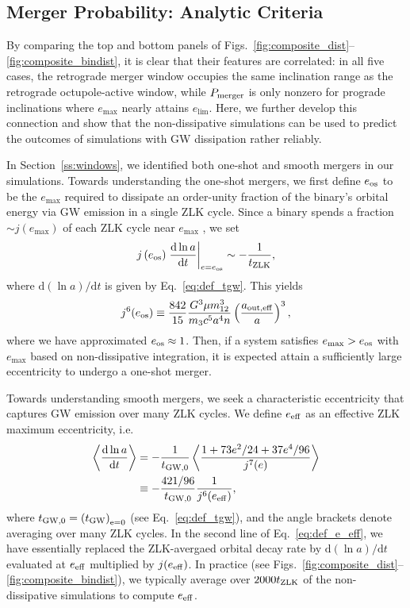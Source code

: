 \documentclass[
        fleqn,
        usenatbib,
    ]{mnras}
\newcommand*{\rd}[2]{\frac{\mathrm{d}#1}{\mathrm{d}#2}}
\newcommand*{\rdil}[2]{\mathrm{d}#1/\mathrm{d}#2}
\newcommand*{\at}[1]{\left.#1\right|}
\newcommand*{\ev}[1]{\left\langle#1\right\rangle}
\newcommand*{\p}[1]{\left(#1\right)}
\begin{document}
\subsection{Merger Probability: Analytic Criteria}\label{ss:nogw_merger}

By comparing the top and bottom panels of
Figs.~\ref{fig:composite_dist}--\ref{fig:composite_bindist}, it is clear that
their features are correlated: in all five cases, the retrograde merger window
occupies the same inclination range as the retrograde octupole-active window,
while $P_{\rm merger}$ is only nonzero for prograde inclinations where
$e_{\max}$ nearly attains $e_{\lim}$. Here, we further develop this connection
and show that the non-dissipative simulations can be used to predict the
outcomes of simulations with GW dissipation rather reliably.

In Section~\ref{ss:windows}, we identified both one-shot and smooth mergers in
our simulations. Towards understanding the one-shot mergers, we first define
$e_{\rm os}$ to be the $e_{\max}$ required to dissipate an order-unity fraction
of the binary's orbital energy via GW emission in a single ZLK cycle. Since a
binary spends a fraction $\sim j(e_{\max})$ of each ZLK cycle near $e_{\max}$
\citep[e.g.,][]{anderson2016formation}, we set
\begin{equation}
    j\p{e_{\rm os}}\at{\rd{\ln a}{t}}_{e = e_{\rm os}} \sim
        -\frac{1}{t_{\rm ZLK}},
\end{equation}
where $\rdil{(\ln a)}{t}$ is given by Eq.~\eqref{eq:def_tgw}. This yields
\begin{equation}
    j^6(e_{\rm os})
        \equiv \frac{842}{15}
            \frac{G^3 \mu m_{12}^3}{m_3c^5a^4n}
            \p{\frac{a_{\rm out, eff}}{a}}^3,
            \label{eq:def_e_os}
\end{equation}
where we have approximated $e_{\rm os} \approx 1$. Then, if a system satisfies
$e_{\max} > e_{\rm os}$ with $e_{\max}$ based on non-dissipative integration, it
is expected attain a sufficiently large eccentricity to undergo a one-shot
merger.

Towards understanding smooth mergers, we seek a characteristic eccentricity that
captures GW emission over many ZLK cycles. We define $e_{\rm eff}$ as an
effective ZLK maximum eccentricity, i.e.
\begin{align}
    \ev{\rd{\ln a}{t}} &= -\frac{1}{t_{\rm GW, 0}}
            \ev{\frac{1 + 73e^2/24 + 37e^4/96}
                {j^7(e)}}\nonumber\\
        &\equiv -\frac{421/96}{t_{\rm GW, 0}}\frac{1}{j^6(e_{\rm eff})},
        \label{eq:def_e_eff}
\end{align}
where $t_{\rm GW, 0} = \p{t_{\rm GW}}_{\rm e = 0}$ (see Eq.~\ref{eq:def_tgw}),
and the angle brackets denote averaging over many ZLK cycles.
In the second line of Eq.~\eqref{eq:def_e_eff}, we have essentially replaced the ZLK-avergaed
orbital decay rate by $\rdil{(\ln a)}{t}$ evaluated at $e_{\rm eff}$ multiplied
by $j(e_{\rm eff})$.
In practice (see Figs.~\ref{fig:composite_dist}--\ref{fig:composite_bindist}),
we typically average over $2000 t_{\rm ZLK}$ of
the non-dissipative simulations to compute $e_{\rm eff}$.
\end{document}
